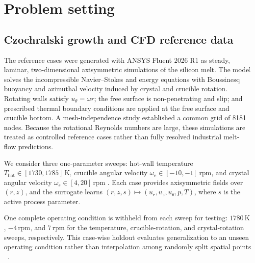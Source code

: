 \documentclass{article}
\begin{document}
\section{Problem setting} \label{sec:problem_setting}

\subsection{Czochralski growth and CFD reference data}
\label{sec:cfd_reference}


The reference cases were generated with ANSYS Fluent 2026 R1 as steady, laminar, two-dimensional axisymmetric simulations of the silicon melt. The model solves the incompressible Navier--Stokes and energy equations with Boussinesq buoyancy and azimuthal velocity induced by crystal and crucible rotation. Rotating walls satisfy $u_\theta=\omega r$; the free surface is non-penetrating and slip; and prescribed thermal boundary conditions are applied at the free surface and crucible bottom. A mesh-independence study established a common grid of 8181 nodes. Because the rotational Reynolds numbers are large, these simulations are treated as controlled reference cases rather than fully resolved industrial melt-flow predictions.

We consider three one-parameter sweeps: hot-wall temperature $T_{\mathrm{hot}}\in[1730,1785]\,\mathrm{K}$, crucible angular velocity $\omega_c\in[-10,-1]\,\mathrm{rpm}$, and crystal angular velocity $\omega_s\in[4,20]\,\mathrm{rpm}$ \citep{shine2026czsiliconmelt}. Each case provides axisymmetric fields over $(r,z)$, and the surrogate learns $(r,z,s) \mapsto (u_r,u_z,u_\theta,p,T)$, where $s$ is the active process parameter.

One complete operating condition is withheld from each sweep for testing: $1780\,\mathrm{K}$, $-4\,\mathrm{rpm}$, and $7\,\mathrm{rpm}$ for the temperature, crucible-rotation, and crystal-rotation sweeps, respectively. This case-wise holdout evaluates generalization to an unseen operating condition rather than interpolation among randomly split spatial points ~\citep{shine2026czsiliconmelt}.
\end{document}
